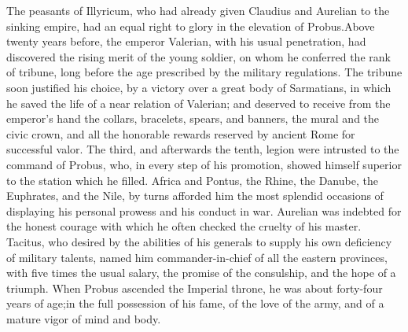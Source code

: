 The peasants of Illyricum, who had already given Claudius and
Aurelian to the sinking empire, had an equal right to glory in
the elevation of Probus.\footnotemark[23] Above twenty years before, the
emperor Valerian, with his usual penetration, had discovered the
rising merit of the young soldier, on whom he conferred the rank
of tribune, long before the age prescribed by the military
regulations. The tribune soon justified his choice, by a victory
over a great body of Sarmatians, in which he saved the life of a
near relation of Valerian; and deserved to receive from the
emperor’s hand the collars, bracelets, spears, and banners, the
mural and the civic crown, and all the honorable rewards reserved
by ancient Rome for successful valor. The third, and afterwards
the tenth, legion were intrusted to the command of Probus, who,
in every step of his promotion, showed himself superior to the
station which he filled. Africa and Pontus, the Rhine, the
Danube, the Euphrates, and the Nile, by turns afforded him the
most splendid occasions of displaying his personal prowess and
his conduct in war. Aurelian was indebted for the honest courage
with which he often checked the cruelty of his master. Tacitus,
who desired by the abilities of his generals to supply his own
deficiency of military talents, named him commander-in-chief of
all the eastern provinces, with five times the usual salary, the
promise of the consulship, and the hope of a triumph. When Probus
ascended the Imperial throne, he was about forty-four years of
age;\footnotemark[24] in the full possession of his fame, of the love of the
army, and of a mature vigor of mind and body.



